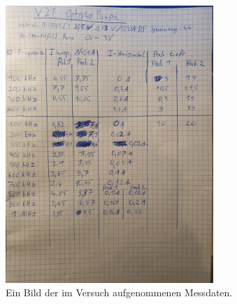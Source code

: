 \begin{figure}[H]
	\centering
	\includegraphics[width=0.7\textwidth]{latex/images/Daten.jpeg}
	\caption{Ein Bild der im Versuch aufgenommenen Messdaten.}
	\label{img:Messdaten}
\end{figure}
